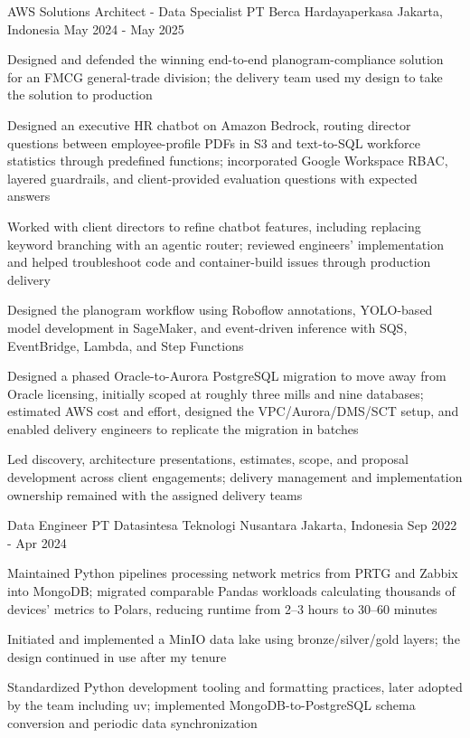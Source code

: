 \begin{cventries}
  \cventry
    {AWS Solutions Architect - Data Specialist} %
    {PT Berca Hardayaperkasa} %
    {Jakarta, Indonesia} %
    {May 2024 - May 2025} %
    {
      \begin{cvitems} %
        \item {Designed and defended the winning end-to-end planogram-compliance solution for an FMCG general-trade division; the delivery team used my design to take the solution to production}
        \item {Designed an executive HR chatbot on Amazon Bedrock, routing director questions between employee-profile PDFs in S3 and text-to-SQL workforce statistics through predefined functions; incorporated Google Workspace RBAC, layered guardrails, and client-provided evaluation questions with expected answers}
        \item {Worked with client directors to refine chatbot features, including replacing keyword branching with an agentic router; reviewed engineers' implementation and helped troubleshoot code and container-build issues through production delivery}
        \item {Designed the planogram workflow using Roboflow annotations, YOLO-based model development in SageMaker, and event-driven inference with SQS, EventBridge, Lambda, and Step Functions}
        \item {Designed a phased Oracle-to-Aurora PostgreSQL migration to move away from Oracle licensing, initially scoped at roughly three mills and nine databases; estimated AWS cost and effort, designed the VPC/Aurora/DMS/SCT setup, and enabled delivery engineers to replicate the migration in batches}
        \item {Led discovery, architecture presentations, estimates, scope, and proposal development across client engagements; delivery management and implementation ownership remained with the assigned delivery teams}
      \end{cvitems}
    }

  \cventry
    {Data Engineer} %
    {PT Datasintesa Teknologi Nusantara} %
    {Jakarta, Indonesia} %
    {Sep 2022 - Apr 2024} %
    {
      \begin{cvitems} %
        \item {Maintained Python pipelines processing network metrics from PRTG and Zabbix into MongoDB; migrated comparable Pandas workloads calculating thousands of devices' metrics to Polars, reducing runtime from 2--3 hours to 30--60 minutes}
        \item {Initiated and implemented a MinIO data lake using bronze/silver/gold layers; the design continued in use after my tenure}
        \item {Standardized Python development tooling and formatting practices, later adopted by the team including uv; implemented MongoDB-to-PostgreSQL schema conversion and periodic data synchronization}
      \end{cvitems}
    }



\end{cventries}
